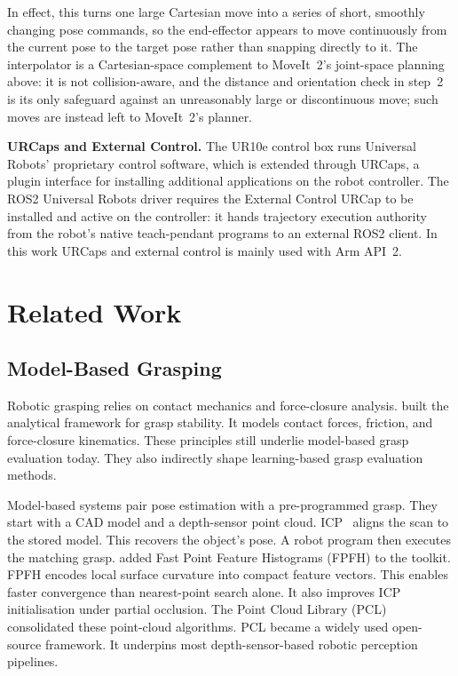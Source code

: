 \documentclass[oneside,studentpaper]{wbk}
\begin{document}
In effect, this turns one large Cartesian move into a series of short, smoothly changing pose commands, so the end-effector appears to move continuously from the current pose to the target pose rather than snapping directly to it. The interpolator is a Cartesian-space complement to MoveIt~2's joint-space planning above: it is not collision-aware, and the distance and orientation check in step~2 is its only safeguard against an unreasonably large or discontinuous move; such moves are instead left to MoveIt~2's planner.

\textbf{URCaps and External Control.} The UR10e control box runs Universal Robots' proprietary control software, which is extended through URCaps, a plugin interface for installing additional applications on the robot controller. The ROS2 Universal Robots driver requires the External Control URCap to be installed and active on the controller: it hands trajectory execution authority from the robot's native teach-pendant programs to an external ROS2 client. In this work URCaps and external control is mainly used with Arm API~2.

\chapter{Related Work}
\label{chap:related-work}

\section{Model-Based Grasping}
\label{sec:model-based-grasping}

Robotic grasping relies on contact mechanics and force-closure analysis. \cite{bicchi2000robotic} built the analytical framework for grasp stability. It models contact forces, friction, and force-closure kinematics. These principles still underlie model-based grasp evaluation today. They also indirectly shape learning-based grasp evaluation methods. 

Model-based systems pair pose estimation with a pre-programmed grasp. They start with a CAD model and a depth-sensor point cloud. ICP~\cite{besl1992} aligns the scan to the stored model. This recovers the object's pose. A robot program then executes the matching grasp. \cite{rusu2009fast} added Fast Point Feature Histograms (FPFH) to the toolkit. FPFH encodes local surface curvature into compact feature vectors. This enables faster convergence than nearest-point search alone. It also improves ICP initialisation under partial occlusion. The Point Cloud Library (PCL)~\cite{rusu2011pcl} consolidated these point-cloud algorithms. PCL became a widely used open-source framework. It underpins most depth-sensor-based robotic perception pipelines.
\end{document}
